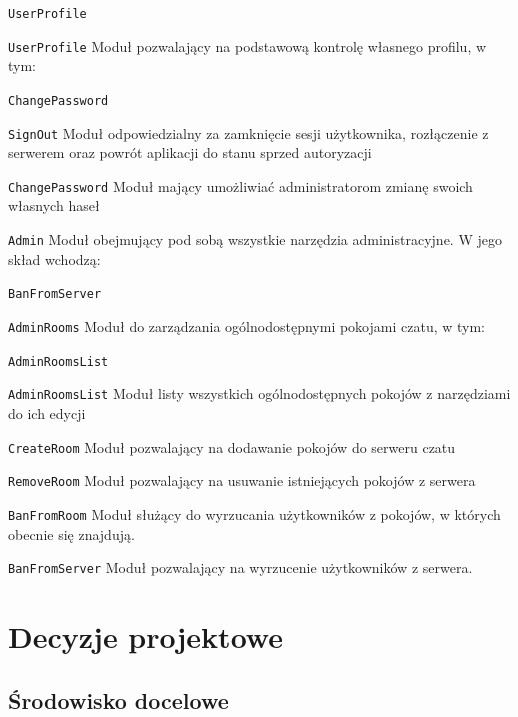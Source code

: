\begin{labeling}{\texttt{UserProfile}}
\item[\texttt{UserProfile}] Moduł pozwalający na podstawową kontrolę
własnego profilu, w tym:

\begin{labeling}{\texttt{ChangePassword}}
	\item[\texttt{SignOut}] Moduł odpowiedzialny za zamknięcie sesji
	użytkownika, rozłączenie z serwerem oraz powrót aplikacji do
	stanu sprzed autoryzacji

	\item[\texttt{ChangePassword}] Moduł mający umożliwiać administratorom
	zmianę swoich własnych haseł

\end{labeling}

\item[\texttt{Admin}] Moduł obejmujący pod sobą wszystkie narzędzia
administracyjne. W jego skład wchodzą:

\begin{labeling}{\texttt{BanFromServer}}
	\item[\texttt{AdminRooms}] Moduł do zarządzania ogólnodostępnymi
	pokojami czatu, w tym:

	\begin{labeling}{\texttt{AdminRoomsList}}
		\item[\texttt{AdminRoomsList}] Moduł listy wszystkich ogólnodostępnych
		pokojów z narzędziami do ich edycji

		\item[\texttt{CreateRoom}] Moduł pozwalający na dodawanie pokojów
		do serweru czatu

		\item[\texttt{RemoveRoom}] Moduł pozwalający na usuwanie istniejących
		pokojów z serwera
	\end{labeling}

	\item[\texttt{BanFromRoom}] Moduł służący do wyrzucania użytkowników
	z pokojów, w których obecnie się znajdują.

	\item[\texttt{BanFromServer}] Moduł pozwalający na wyrzucenie
	użytkowników z serwera.
\end{labeling}

\end{labeling}
\section{Decyzje projektowe}

\subsection{Środowisko docelowe}


